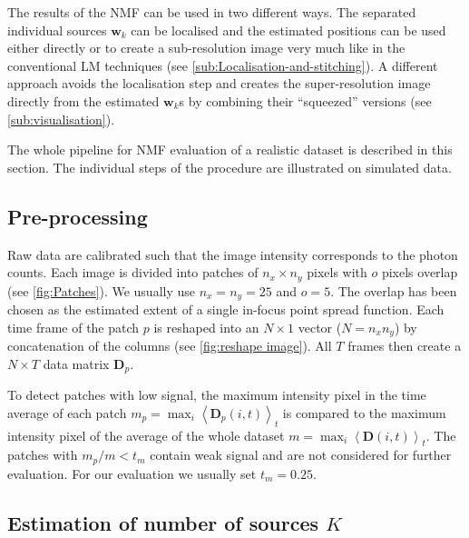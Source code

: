 The results of the NMF can be used in two different ways. The separated individual sources $\bm{w}_k$ can be localised and the estimated positions can be used either directly or to create a sub-resolution image very much like in the conventional LM techniques (see \autoref{sub:Localisation-and-stitching}). A different approach avoids the localisation step and creates the super-resolution image directly from the estimated $\bm{w}_k$s by combining their ``squeezed'' versions (see \autoref{sub:visualisation}). 

The whole pipeline for NMF evaluation of a realistic dataset is described in this section.  The individual steps of the procedure are illustrated on simulated data. 


\subsection{Pre-processing \label{sec:preproc}}

Raw data are calibrated such that the image intensity corresponds to the photon counts. Each image is divided into patches of $n_x\times n_y$ pixels with $o$ pixels overlap (see \autoref{fig:Patches}). We usually use $n_x=n_y=25$ and $o=5$. The overlap has been chosen as the estimated extent of a single in-focus point spread function. Each time frame of the patch $p$ is reshaped into an $N\times1$ vector ($N=n_x n_y$)  by concatenation of the columns (see \autoref{fig:reshape image}). All $T$ frames then create a $N \times T$ data matrix $\bm{D}_p$.

To detect patches with low signal, the maximum intensity pixel in the time average of each patch $m_p=\max_i\left\langle \bm{D}_p(i,t)\right\rangle _t$ is compared to the maximum intensity pixel of the average of the whole dataset $m=\max_i\left\langle \bm{D}(i,t)\right\rangle _t$. The patches with $m_p/m< t_m$ contain weak signal and are not considered for further evaluation. For our evaluation we usually set $t_m=0.25.$

\subsection{Estimation of number of sources $K$\label{sub:Estimation-of-number-of-sources}}

